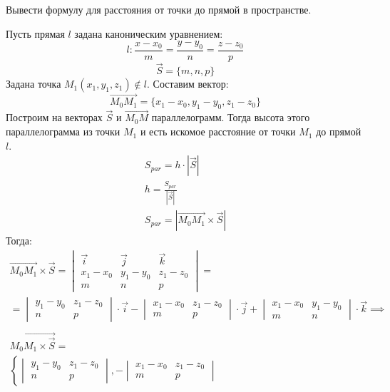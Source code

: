 \begin{question}
  Вывести формулу для расстояния от точки до прямой в пространстве.
\end{question}
\begin{answer}
  Пусть прямая $l$ задана каноническим уравнением:  \[
l: \frac{x - x_0}{m} = \frac{y - y_0}{n} = \frac{z - z_0}{p}
\] \[
\vec{S} = \{m, n, p\} 
\] 
Задана точка $M_1(x_1, y_1, z_1) \not \in l$.
Составим вектор:  \[
\overrightarrow{M_0M_1} = \{x_1 - x_0, y_1 - y_0, z_1 - z_0\} 
\] 
Построим на векторах $\vec{S}$ и $\overrightarrow{M_0M}$ параллелограмм.
Тогда высота этого параллелограмма из точки $M_1$ и есть искомое расстояние от точки $M_1$ до прямой $l$.
\begin{gather*}
  S_{par} = h \cdot |\vec{S}| \\
  h = \frac{S_{par}}{|\vec{S}|} \\
  S_{par} = |\overrightarrow{M_0M_1} \times \vec{S}| 
\end{gather*}
Тогда:
\begin{gather*}
  \overrightarrow{M_0M_1} \times \vec{S} = 
  \begin{vmatrix}
    \vec{i} & \vec{j} & \vec{k} \\
    x_1 - x_0 & y_1 - y_0 & z_1 - z_0 \\
    m & n & p
  \end{vmatrix} = \\
  = \begin{vmatrix}
    y_1 - y_0 & z_1 - z_0 \\
    n & p
  \end{vmatrix} \cdot \vec{i} -
  \begin{vmatrix}
    x_1 - x_0 & z_1 - z_0 \\
    m & p
  \end{vmatrix} \cdot \vec{j} + 
  \begin{vmatrix}
    x_1 - x_0 & y_1 - y_0 \\
    m & n
  \end{vmatrix} \cdot \vec{k} \implies \\
  \\
  \overrightarrow{M_0M_1 \times \vec{S}} = \\
  \left\{
  \begin{vmatrix}
    y_1 - y_0 & z_1 - z_0 \\
    n & p
  \end{vmatrix},
   - \begin{vmatrix}
    x_1 - x_0 & z_1 - z_0 \\
    m & p

\end{vmatrix}
\end{gather*}
\end{answer}
